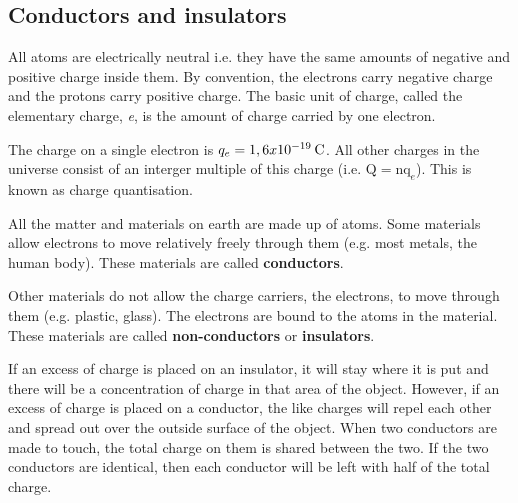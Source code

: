             \subsection{ Conductors and insulators}
            \nopagebreak
            \label{m38781*id201248}All atoms are electrically neutral i.e. they have the same amounts of negative and positive
charge inside them. By convention, the electrons carry negative charge and the protons carry
positive charge.
The basic unit of charge, called the elementary charge, \textsl{e}, is
the amount of charge carried by one electron.\par 
      \label{m38781*eip-517}The charge on a single electron is \begin{math}{q}_{e}=1,6x{10}^{-19}\phantom{\rule{2pt}{0ex}}\mathrm{C}\end{math}. All other charges in the universe consist of an interger multiple of this charge (i.e. \begin{math}\mathrm{Q}={\mathrm{nq}}_{e}\end{math}). This is known as charge quantisation.
\par \label{m38781*id201259}All the matter and materials on earth are made up of atoms.
Some materials allow electrons to move relatively freely
through them (e.g. most metals, the human body).
These materials are called \textbf{conductors}.\par 
      \label{m38781*id201271}Other materials do not allow the charge carriers, the electrons, to move
through them (e.g. plastic, glass).
The electrons are bound to the atoms in the material. These materials are called
\textbf{non-conductors} or \textbf{insulators}.\par 
      \label{m38781*id201289}If an excess of charge is placed on an insulator, it will stay
where it is put and there will be a concentration of charge in
that area of the object. However, if an excess of charge is placed
on a conductor, the like charges will repel each other
and spread out over the outside surface of the object. When two conductors
are made to touch, the total charge on them is shared between the
two. If the two conductors are identical, then each conductor will
be left with half of the total charge.\par 
\label{m38781*eip-536}
